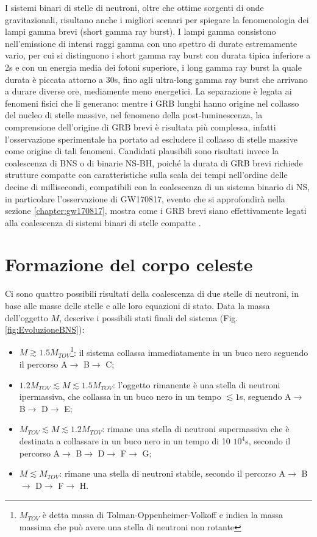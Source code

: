 I sistemi binari di stelle di neutroni, oltre che ottime sorgenti di onde gravitazionali, risultano anche i migliori scenari per spiegare la fenomenologia dei lampi gamma brevi (short gamma ray burst). I lampi gamma consistono nell'emissione di intensi raggi gamma con uno spettro di durate estremamente vario, per cui si distinguono i short gamma ray burst con durata tipica inferiore a 2s e con un energia media dei fotoni superiore, i long gamma ray burst la quale durata è piccata attorno a 30s, fino agli ultra-long gamma ray burst che arrivano a durare diverse ore, mediamente meno energetici. 
La separazione è legata ai fenomeni fisici che li generano: mentre i GRB lunghi hanno origine nel collasso del nucleo di stelle massive, nel fenomeno della post-luminescenza, la comprensione dell'origine di GRB brevi è risultata più complessa, infatti l'osservazione sperimentale ha portato ad escludere il collasso di stelle massive come origine di tali fenomeni. Candidati plausibili sono risultati invece la coalescenza di BNS o di binarie NS-BH, poiché la durata di GRB brevi richiede strutture compatte con caratteristiche sulla scala dei tempi nell'ordine delle decine di millisecondi, compatibili con la coalescenza di un sistema binario di NS, in particolare l'osservazione di GW170817, evento che si approfondirà nella sezione \ref{chapter:gw170817}, mostra come i GRB brevi siano effettivamente legati alla coalescenza di sistemi binari di stelle compatte \cite{maggiore2018gravitational}.
\section{Formazione del corpo celeste}
\label{section:residual}
Ci sono quattro possibili risultati della coalescenza di due stelle di neutroni, in base alle masse delle stelle e alle loro equazioni di stato. 
Data la massa dell'oggetto $M$, \cite{sarin2020evolution} descrive i possibili stati finali del sistema (Fig.\ref{fig:EvoluzioneBNS}):
\begin{itemize}
	\item $M\gtrsim 1.5 M_{TOV}$\footnote{$M_{TOV}$ è detta massa di Tolman-Oppenheimer-Volkoff e indica la massa massima che può avere una stella di neutroni non rotante}: il sistema collassa immediatamente in un buco nero seguendo il percorso A$\rightarrow$ B$\rightarrow$ C;
\end{itemize}

\begin{itemize}
	\item $1.2 M_{TOV} \lesssim M \lesssim 1.5 M_{TOV}$: l'oggetto rimanente è una stella di neutroni ipermassiva, che collassa in un buco nero in un tempo $\lesssim 1$s, seguendo A$\rightarrow$ B$\rightarrow$ D$\rightarrow$ E;		
	\item $M_{TOV} \lesssim M \lesssim 1.2 M_{TOV}$: rimane una stella di neutroni supermassiva che è destinata a collassare in un buco nero in un tempo di 10 \textdiv $10^4$s, secondo il percorso A$\rightarrow$ B$\rightarrow$ D$\rightarrow$ F$\rightarrow$ G;		\item $M\lesssim M_{TOV}$: rimane una stella di neutroni stabile, secondo il percorso A$\rightarrow$ B$\rightarrow$ D$\rightarrow$ F$\rightarrow$ H.	
\end{itemize}

